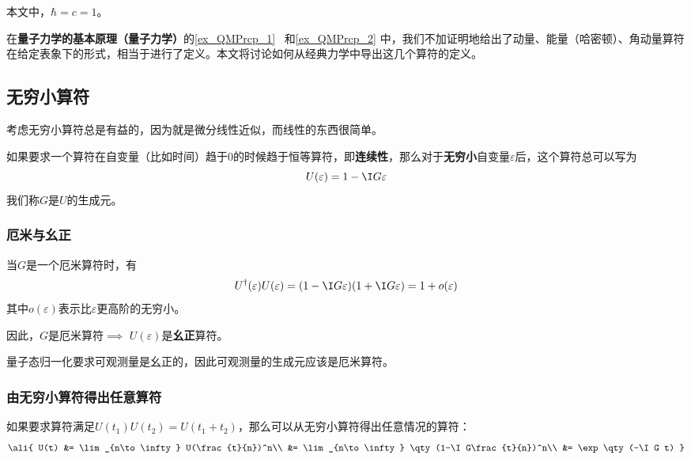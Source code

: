 

本文中，$\hbar=c=1$。

在\textbf{量子力学的基本原理（量子力学）}的\autoref{ex_QMPrcp_1}~ 和\autoref{ex_QMPrcp_2} 中，我们不加证明地给出了动量、能量（哈密顿）、角动量算符在给定表象下的形式，相当于进行了定义。本文将讨论如何从经典力学中导出这几个算符的定义。

\subsection{无穷小算符}



考虑无穷小算符总是有益的，因为就是微分线性近似，而线性的东西很简单。

如果要求一个算符在自变量（比如时间）趋于$0$的时候趋于恒等算符，即\textbf{连续性}，那么对于\textbf{无穷小}自变量$\varepsilon$后，这个算符总可以写为
\begin{equation}\label{eq_OprQM_1}
U(\varepsilon) = 1-\I G\varepsilon
\end{equation}
我们称$G$是$U$的生成元。

\subsubsection{厄米与幺正}

当$G$是一个厄米算符时，有
\begin{equation}
U^{\dagger}(\varepsilon)U(\varepsilon) = (1-\I G\varepsilon)(1+\I G\varepsilon) = 1+o(\varepsilon)
\end{equation}
其中$o(\varepsilon)$表示比$\varepsilon$更高阶的无穷小。

因此，$G$是厄米算符$\implies$ $U(\varepsilon)$是\textbf{幺正}算符。

量子态归一化要求可观测量是幺正的，因此可观测量的生成元应该是厄米算符。


\subsubsection{由无穷小算符得出任意算符}

如果要求算符满足$U(t_1)U(t_2)=U(t_1+t_2)$，那么可以从无穷小算符得出任意情况的算符：
\begin{equation}
\ali{
    U(t) &= \lim_{n\to\infty}  U(\frac{t}{n})^n\\
    &= \lim_{n\to\infty} \qty(1-\I G\frac{t}{n})^n\\
    &= \exp\qty(-\I G t)
}
\end{equation}



